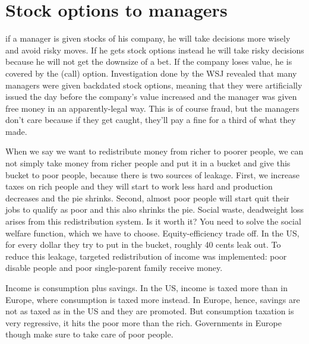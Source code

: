 \section{Stock options to managers}

if a manager is given stocks of his company, he will take decisions more wisely and avoid risky moves. If he gets stock options instead he will take risky decisions because he will not get the downsize of a bet. If the company loses value, he is covered by the (call) option. Investigation done by the WSJ revealed that many managers were given backdated stock options, meaning that they were artificially issued the day before the company's value increased and the manager was given free money in an apparently-legal way. This is of course fraud, but the managers don't care because if they get caught, they'll pay a fine for a third of what they made.


When we say we want to redistribute money from richer to poorer people, we can not simply take money from richer people and put it in a bucket and give this bucket to poor people, because there is two sources of leakage. First, we increase taxes on rich people and they will start to work less hard and production decreases and the pie shrinks. Second, almost poor people will start quit their jobs to qualify as poor and this also shrinks the pie. Social waste, deadweight loss arises from this redistribution system. Is it worth it? You need to solve the social welfare function, which we have to choose. Equity-efficiency trade off.
In the US, for every dollar they try to put in the bucket, roughly 40 cents leak out.
To reduce this leakage, targeted redistribution of income was implemented: poor disable people and poor single-parent family receive money.

Income is consumption plus savings. In the US, income is taxed more than in Europe, where consumption is taxed more instead. In Europe, hence, savings are not as taxed as in the US and they are promoted. But consumption taxation is very regressive, it hits the poor more than the rich. Governments in Europe though make sure to take care of poor people.

